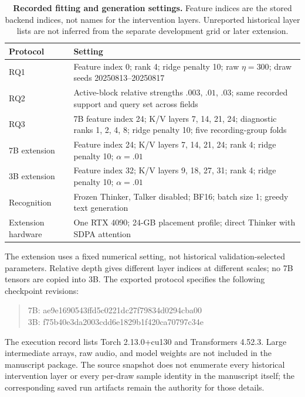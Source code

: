 \documentclass{article}
\begin{document}
\begin{table}[htbp]
\caption{\textbf{Recorded fitting and generation settings.} Feature indices are the stored backend indices, not names for the intervention layers. Unreported historical layer lists are not inferred from the separate development grid or later extension.}
\label{tab:settings}
\centering\small
\begin{tabular}{@{}L{3.35cm}L{9.65cm}@{}}
\toprule
Protocol & Setting \\
\midrule
RQ1 & Feature index 0; rank 4; ridge penalty 10; raw $\eta=300$; draw seeds 20250813--20250817 \\
RQ2 & Active-block relative strengths $.003$, $.01$, $.03$; same recorded support and query set across fields \\
RQ3 & 7B feature index 24; K/V layers 7, 14, 21, 24; diagnostic ranks 1, 2, 4, 8; ridge penalty 10; five recording-group folds \\
7B extension & Feature index 24; K/V layers 7, 14, 21, 24; rank 4; ridge penalty 10; $\alpha=.01$ \\
3B extension & Feature index 32; K/V layers 9, 18, 27, 31; rank 4; ridge penalty 10; $\alpha=.01$ \\
Recognition & Frozen Thinker, Talker disabled; BF16; batch size 1; greedy text generation \\
Extension hardware & One RTX 4090; 24-GB placement profile; direct Thinker with SDPA attention \\
\bottomrule
\end{tabular}
\end{table}

The extension uses a fixed numerical setting, not historical validation-selected parameters. Relative depth gives different layer indices at different scales; no 7B tensors are copied into 3B. The exported protocol specifies the following checkpoint revisions:
\begin{quote}\small\ttfamily
7B: ae9e1690543ffd5c0221dc27f79834d0294cba00\\
3B: f75b40e3da2003cdd6e1829b1f420ca70797c34e
\end{quote}
The execution record lists Torch 2.13.0+cu130 and Transformers 4.52.3. Large intermediate arrays, raw audio, and model weights are not included in the manuscript package. The source snapshot does not enumerate every historical intervention layer or every per-draw sample identity in the manuscript itself; the corresponding saved run artifacts remain the authority for those details.
\end{document}
